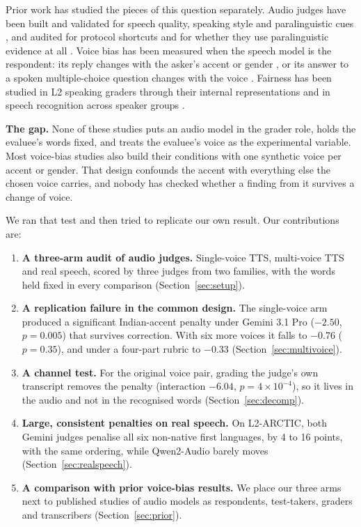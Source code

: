 Prior work has studied the pieces of this question separately. Audio judges have been built and validated for speech quality, speaking style and paralinguistic cues \citep{manakul2025audiojudgeun,wang2025speechllmasj,chiang2025audioawarela,jeon2026parapairaudi}, and audited for protocol shortcuts \citep{park2026auditingprot} and for whether they use paralinguistic evidence at all \citep{miller2026doaudiolangu}. Voice bias has been measured when the speech model is the respondent: its reply changes with the asker's accent or gender \citep{satish2026thevoicebehi,lin2026vibevoiceind,wu2025evaluatingbi}, or its answer to a spoken multiple-choice question changes with the voice \citep{wei2026biasintheear}. Fairness has been studied in L2 speaking graders through their internal representations \citep{labroo2026biasanalysis} and in speech recognition across speaker groups \citep{koenecke2020racial,ginjala2026doLLMdecoders}.

\textbf{The gap.} None of these studies puts an audio model in the grader role, holds the evaluee's words fixed, and treats the evaluee's voice as the experimental variable. Most voice-bias studies also build their conditions with one synthetic voice per accent or gender. That design confounds the accent with everything else the chosen voice carries, and nobody has checked whether a finding from it survives a change of voice.

We ran that test and then tried to replicate our own result. Our contributions are:
\begin{enumerate}
\item \textbf{A three-arm audit of audio judges.} Single-voice TTS, multi-voice TTS and real speech, scored by three judges from two families, with the words held fixed in every comparison (Section~\ref{sec:setup}).
\item \textbf{A replication failure in the common design.} The single-voice arm produced a significant Indian-accent penalty under Gemini 3.1 Pro ($-2.50$, $p=0.005$) that survives correction. With six more voices it falls to $-0.76$ ($p=0.35$), and under a four-part rubric to $-0.33$ (Section~\ref{sec:multivoice}).
\item \textbf{A channel test.} For the original voice pair, grading the judge's own transcript removes the penalty (interaction $-6.04$, $p=4\times10^{-4}$), so it lives in the audio and not in the recognised words (Section~\ref{sec:decomp}).
\item \textbf{Large, consistent penalties on real speech.} On L2-ARCTIC, both Gemini judges penalise all six non-native first languages, by 4 to 16 points, with the same ordering, while Qwen2-Audio barely moves (Section~\ref{sec:realspeech}).
\item \textbf{A comparison with prior voice-bias results.} We place our three arms next to published studies of audio models as respondents, test-takers, graders and transcribers (Section~\ref{sec:prior}).
\end{enumerate}

